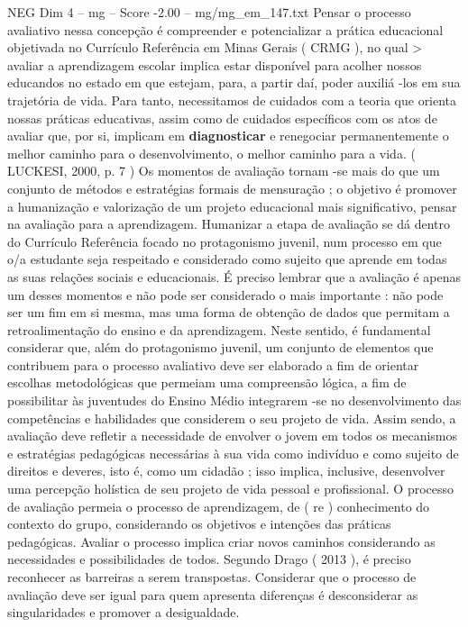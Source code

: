 \begin{textsample}{NEG Dim 4 – mg – Score -2.00 – mg/mg\_em\_147.txt}
Pensar o processo avaliativo nessa concepção é compreender e potencializar a prática educacional objetivada no Currículo Referência em Minas Gerais ( CRMG ), no qual > avaliar a aprendizagem escolar implica estar disponível para acolher nossos educandos no estado em que estejam, para, a partir daí, poder auxiliá -los em sua trajetória de vida.
Para tanto, necessitamos de cuidados com a teoria que orienta nossas práticas educativas, assim como de cuidados específicos com os atos de avaliar que, por si, implicam em \textbf{diagnosticar} e renegociar permanentemente o melhor caminho para o desenvolvimento, o melhor caminho para a vida. ( LUCKESI, 2000, p. 7 ) Os momentos de avaliação tornam -se mais do que um conjunto de métodos e estratégias formais de mensuração ; o objetivo é promover a humanização e valorização de um projeto educacional mais significativo, pensar na avaliação para a aprendizagem.
Humanizar a etapa de avaliação se dá dentro do Currículo Referência focado no protagonismo juvenil, num processo em que o/a estudante seja respeitado e considerado como sujeito que aprende em todas as suas relações sociais e educacionais.
É preciso lembrar que a avaliação é apenas um desses momentos e não pode ser considerado o mais importante : não pode ser um fim em si mesma, mas uma forma de obtenção de dados que permitam a retroalimentação do ensino e da aprendizagem.
Neste sentido, é fundamental considerar que, além do protagonismo juvenil, um conjunto de elementos que contribuem para o processo avaliativo deve ser elaborado a fim de orientar escolhas metodológicas que permeiam uma compreensão lógica, a fim de possibilitar às juventudes do Ensino Médio integrarem -se no desenvolvimento das competências e habilidades que considerem o seu projeto de vida.
Assim sendo, a avaliação deve refletir a necessidade de envolver o jovem em todos os mecanismos e estratégias pedagógicas necessárias à sua vida como indivíduo e como sujeito de direitos e deveres, isto é, como um cidadão ; isso implica, inclusive, desenvolver uma percepção holística de seu projeto de vida pessoal e profissional.
O processo de avaliação permeia o processo de aprendizagem, de ( re ) conhecimento do contexto do grupo, considerando os objetivos e intenções das práticas pedagógicas.
Avaliar o processo implica criar novos caminhos considerando as necessidades e possibilidades de todos.
Segundo Drago ( 2013 ), é preciso reconhecer as barreiras a serem transpostas.
Considerar que o processo de avaliação deve ser igual para quem apresenta diferenças é desconsiderar as singularidades e promover a desigualdade.

\end{textsample}
